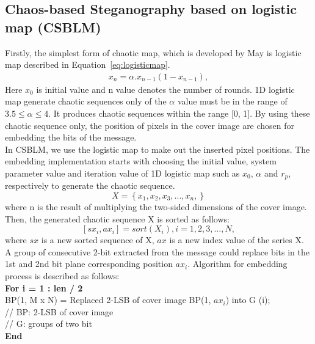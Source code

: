 \documentclass[conference]{IEEEtran}
\begin{document}
\subsection{Chaos-based Steganography based on logistic map (CSBLM)}
\indent Firstly, the simplest form of chaotic map, which is developed by May \cite{b6} is logistic map described in Equation~\eqref{eq:logisticmap}.
\begin{align}
x_{n} = \alpha.x_{n-1}(1-x_{n-1}),
\label{eq:logisticmap} 
\end{align}
Here \(x_{0}\) is initial value and n value denotes the number of rounds. 1D logistic map generate chaotic sequences only of the \(\alpha\) value must be in the range of \(3.5 \leq \alpha \leq 4\)\cite{b7}. It produces chaotic sequences within the range [0, 1]. By using these chaotic sequence only, the position of pixels in the cover image are chosen for embedding the bits of the message. \\
\indent In CSBLM, we use the logistic map to make out the inserted pixel positions. The embedding implementation starts with choosing the initial value, system parameter value and iteration value of 1D logistic map such as \(x_{0}\), \(\alpha\) and \(r_{p}\), respectively to generate the chaotic sequence. \[X = \left\{x_{1}, x_{2}, x_{3}, ..., x_{n},\right\}\] where n is the result of multiplying the two-sided dimensions of the cover image. Then, the generated chaotic sequence X is sorted as follows: \[\left[sx_{i}, ax_{i}\right] = sort(X_{i}), i = 1,2,3,...,N,\] where \(sx\) is a new sorted sequence of X, \(ax\) is a new index value of the series X. A group of consecutive 2-bit extracted from the message could replace bits in the 1st and 2nd bit plane corresponding position \(ax_{i}\). Algorithm for embedding process is described as follows: \\[0.2cm]
\textbf{For i = 1 : len / 2} \\
\indent \indent BP(1, M x N) = Replaced 2-LSB of cover image BP(1, \(ax_{i}\)) into G (i); \\
\indent \indent // BP: 2-LSB of cover image\\
\indent \indent // G: groups of two bit\\
\textbf{End}
\end{document}
